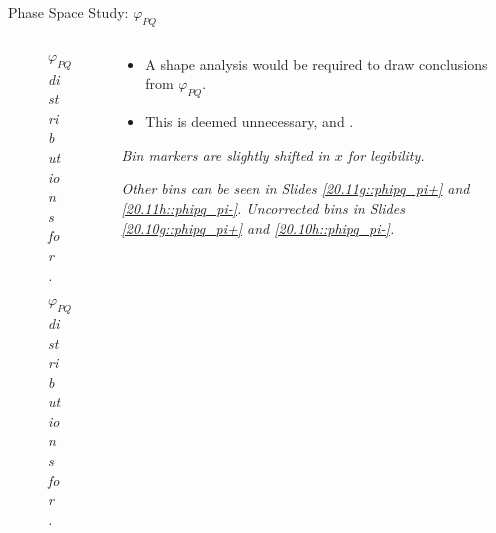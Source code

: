 \begin{frame}{Phase Space Study: $\varphi_{PQ}$}
    \label{12.16::phipq}

    \begin{columns}[onlytextwidth,T]

    \begin{column}{.44\linewidth}
        \vspace{-15pt}
        \begin{center}
            \begin{figure}[t]
                \scriptsize{\textit{$\varphi_{PQ}$ distributions for \ef{$\pi^-$}.}}
            \end{figure}

            \vspace{-9pt}
            \begin{figure}[t]
                \scriptsize{\textit{$\varphi_{PQ}$ distributions for \ef{$\pi^+$}.}}
            \end{figure}
        \end{center}
    \end{column}

    \begin{column}{.54\linewidth}
        \begin{itemize}
            \item
                A shape analysis would be required to draw conclusions from $\varphi_{PQ}$.

            \vspace{12pt}
            \item
                This is deemed unnecessary, and .
        \end{itemize}

        \vspace{119pt}

        \begin{flushright}
            \tiny{\textit{Bin markers are slightly shifted in $x$ for legibility.}}

            \tiny{\textit{
                Other bins can be seen in Slides \textcolor{efd_purple}{\ref{20.11g::phipq_pi+}} and \textcolor{efd_purple}{\ref{20.11h::phipq_pi-}}.
                Uncorrected bins in Slides \textcolor{efd_purple}{\ref{20.10g::phipq_pi+}} and \textcolor{efd_purple}{\ref{20.10h::phipq_pi-}}.
            }}
        \end{flushright}
    \end{column}

    \end{columns}
\end{frame}
